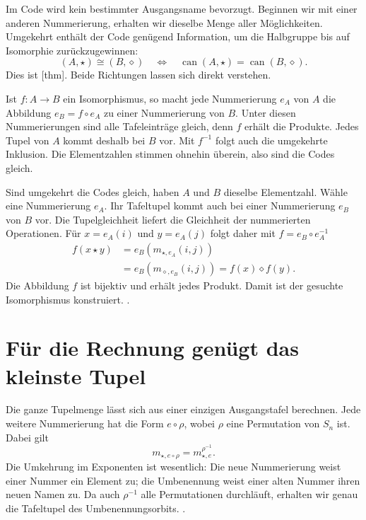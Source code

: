 Im Code wird kein bestimmter Ausgangsname bevorzugt. Beginnen wir
mit einer anderen Nummerierung, erhalten wir dieselbe Menge aller
Möglichkeiten. Umgekehrt enthält der Code genügend Information,
um die Halbgruppe bis auf Isomorphie zurückzugewinnen:
\[
  (A,\star)\cong(B,\diamond)
  \quad\Longleftrightarrow\quad
  \operatorname{can}(A,\star)=\operatorname{can}(B,\diamond).
\]
Dies ist
[thm].
Beide Richtungen lassen sich direkt verstehen.

Ist \(f\colon A\to B\) ein Isomorphismus, so macht jede Nummerierung
\(e_A\) von \(A\) die Abbildung \(e_B=f\circ e_A\) zu einer
Nummerierung von \(B\). Unter diesen Nummerierungen sind alle
Tafeleinträge gleich, denn \(f\) erhält die Produkte. Jedes Tupel
von \(A\) kommt deshalb bei \(B\) vor. Mit \(f^{-1}\) folgt auch
die umgekehrte Inklusion. Die Elementzahlen stimmen ohnehin überein,
also sind die Codes gleich.

Sind umgekehrt die Codes gleich, haben \(A\) und \(B\) dieselbe
Elementzahl. Wähle eine Nummerierung \(e_A\). Ihr Tafeltupel kommt
auch bei einer Nummerierung \(e_B\) von \(B\) vor. Die Tupelgleichheit
liefert die Gleichheit der nummerierten Operationen. Für
\(x=e_A(i)\) und \(y=e_A(j)\) folgt daher mit
\(f=e_B\circ e_A^{-1}\)
\[
\begin{aligned}
  f(x\star y)
   &=e_B(m_{\star,e_A}(i,j))\\
   &=e_B(m_{\diamond,e_B}(i,j))
     =f(x)\diamond f(y).
\end{aligned}
\]
Die Abbildung \(f\) ist bijektiv und erhält jedes Produkt. Damit ist
der gesuchte Isomorphismus konstruiert.
.

\section*{Für die Rechnung genügt das kleinste Tupel}

Die ganze Tupelmenge lässt sich aus einer einzigen Ausgangstafel
berechnen. Jede weitere Nummerierung hat die Form \(e\circ\rho\),
wobei \(\rho\) eine Permutation von \(S_n\) ist. Dabei gilt
\[
  m_{\star,e\circ\rho}=m_{\star,e}^{\rho^{-1}}.
\]
Die Umkehrung im Exponenten ist wesentlich: Die neue Nummerierung
weist einer Nummer ein Element zu; die Umbenennung weist einer alten
Nummer ihren neuen Namen zu. Da auch \(\rho^{-1}\) alle Permutationen
durchläuft, erhalten wir genau die Tafeltupel des Umbenennungsorbits.
.

